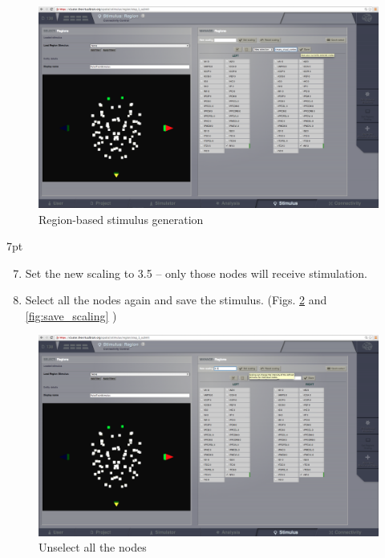 \documentclass{tufte-handout}
\newenvironment{formal}{%
  \def\FrameCommand{%
    \hspace{1pt}%
    {\color{DarkBlue}\vrule width 2pt}%
    {\color{formalshade}\vrule width 4pt}%
    \colorbox{formalshade}%
  }%
  \MakeFramed{\advance\hsize-\width\FrameRestore}%
  \noindent\hspace{-4.55pt}%
  \begin{adjustwidth}{}{7pt}%
  \vspace{2pt}\vspace{2pt}%
}
{%
  \vspace{2pt}\end{adjustwidth}\endMakeFramed%
}
\begin{document}
\begin{figure}[h]
  \includegraphics[width=\linewidth]{Handout_UI_HeterogenousModelAndStimulation_StimulusRegionSaveSelection}%
  \caption{Region-based stimulus generation}%
  \label{fig:save_selection}%
\end{figure}

\newpage
\begin{formal}
\begin{enumerate}[resume]
\setcounter{enumi}{6}
\item Set the new scaling to 3.5 -- only those nodes will receive stimulation. 
\item Select all the nodes again and save the stimulus. (Figs. \ref{fig:set_scaling} and \ref{fig:save_scaling} )
\end{enumerate}
\end{formal}

\begin{figure}[h]
  \includegraphics[width=\linewidth]{Handout_UI_HeterogenousModelAndStimulation_StimulusRegionSetScaling}%
  \caption{Unselect all the nodes}%
  \label{fig:set_scaling}%
\end{figure}
\end{document}
